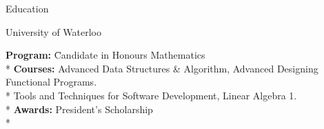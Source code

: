 \documentclass{article}
\newlength{\tabin}
\newlength{\secsep}
\newcommand{\lineunder}{\vspace*{-8pt} \\ \hspace*{-6pt} \hrulefill \\ \vspace*{-15pt}}
\newenvironment{tabbedsection}[1]{
  \begin{list}{}{
      \setlength{\itemsep}{0pt}
      \setlength{\labelsep}{0pt}
      \setlength{\labelwidth}{0pt}
      \setlength{\leftmargin}{\tabin}
      \setlength{\rightmargin}{\tabin}
      \setlength{\listparindent}{0pt}
      \setlength{\parsep}{0pt}
      \setlength{\parskip}{0pt}
      \setlength{\partopsep}{0pt}
      \setlength{\topsep}{#1}
    }
  \item[]
}{\end{list}}
\newenvironment{nospacetabbing}{
    \begin{tabbing}
}{\end{tabbing}\vspace{-1.2em}}
\newenvironment{resume_section}[1]{
  \filbreak
  \vspace{2\secsep}
  \textsc{\large#1}
  \lineunder
  \begin{tabbedsection}{\secsep}
}{\end{tabbedsection}}
\newenvironment{resume_subsection}[2][]{
  \textbf{#2} \hfill {\footnotesize #1} \hspace{-5.1em}
  \begin{tabbedsection}{0.5\secsep}
}{\end{tabbedsection}}
\begin{document}
\begin{resume_section}{Education}
  \begin{resume_subsection}[07/2022 - Present]{University of Waterloo}
    \begin{nospacetabbing}
      \textbf{Program:} \= Candidate in Honours Mathematics \\*
      \textbf{Courses:} \>Advanced Data Structures \& Algorithm, Advanced Designing Functional Programs.
                        \\*\> Tools and Techniques for Software Development, Linear Algebra 1.\\*
      \textbf{Awards:} \> President's Scholarship\\*
    \end{nospacetabbing}
  \end{resume_subsection}
\end{resume_section}



  
\end{document}
